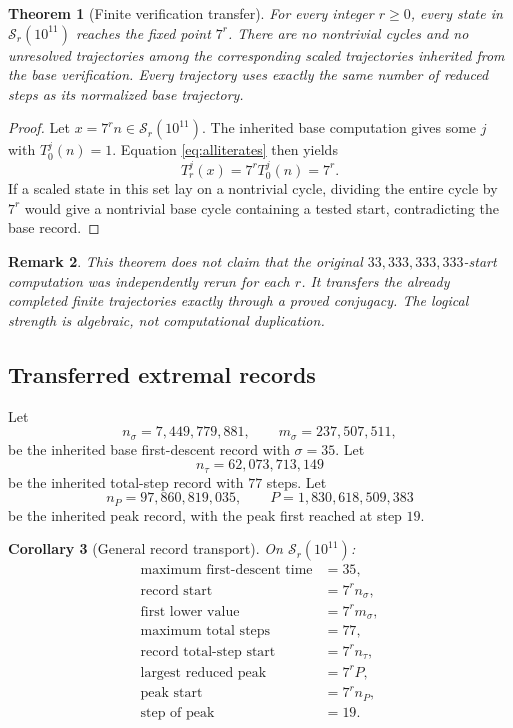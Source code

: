 \documentclass[11pt]{article}
\newtheorem{theorem}{Theorem}[section]
\newtheorem{corollary}[theorem]{Corollary}
\newtheorem{remark}[theorem]{Remark}
\begin{document}
\begin{theorem}[Finite verification transfer]
For every integer $r\ge0$, every state in $\mathcal S_r(10^{11})$ reaches the fixed point $7^r$. There are no nontrivial cycles and no unresolved trajectories among the corresponding scaled trajectories inherited from the base verification. Every trajectory uses exactly the same number of reduced steps as its normalized base trajectory.
\end{theorem}
\begin{proof}
Let $x=7^rn\in\mathcal S_r(10^{11})$. The inherited base computation gives some $j$ with $T_0^j(n)=1$. Equation \eqref{eq:alliterates} then yields
\[
T_r^j(x)=7^rT_0^j(n)=7^r.
\]
If a scaled state in this set lay on a nontrivial cycle, dividing the entire cycle by $7^r$ would give a nontrivial base cycle containing a tested start, contradicting the base record.
\end{proof}

\begin{remark}
This theorem does not claim that the original $33,333,333,333$-start computation was independently rerun for each $r$. It transfers the already completed finite trajectories exactly through a proved conjugacy. The logical strength is algebraic, not computational duplication.
\end{remark}

\subsection{Transferred extremal records}
Let
\[
n_\sigma=7,449,779,881,\qquad m_\sigma=237,507,511,
\]
be the inherited base first-descent record with $\sigma=35$. Let
\[
n_\tau=62,073,713,149
\]
be the inherited total-step record with $77$ steps. Let
\[
n_P=97,860,819,035,\qquad P=1,830,618,509,383
\]
be the inherited peak record, with the peak first reached at step $19$.

\begin{corollary}[General record transport]
On $\mathcal S_r(10^{11})$:
\begin{align*}
\text{maximum first-descent time}&=35,\\
\text{record start}&=7^r n_\sigma,\\
\text{first lower value}&=7^r m_\sigma,\\
\text{maximum total steps}&=77,\\
\text{record total-step start}&=7^r n_\tau,\\
\text{largest reduced peak}&=7^rP,\\
\text{peak start}&=7^rn_P,\\
\text{step of peak}&=19.
\end{align*}
\end{corollary}
\end{document}
